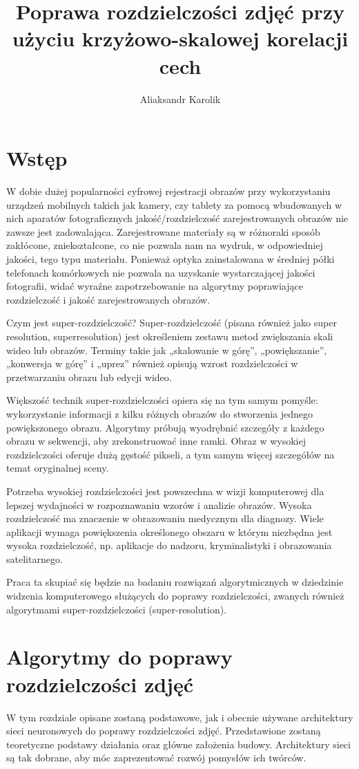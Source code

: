 \documentclass[a4paper,12pt,twoside,openany]{report}
\title{Poprawa rozdzielczości zdjęć przy użyciu krzyżowo-skalowej korelacji cech}
\author{Aliaksandr Karolik}
\begin{document}
\maketitle

\chapter{Wstęp}
	W dobie dużej popularności cyfrowej rejestracji obrazów przy wykorzystaniu urządzeń mobilnych takich jak kamery, czy tablety za pomocą wbudowanych w  nich aparatów fotograficznych jakość/rozdzielczość zarejestrowanych obrazów nie zawsze jest zadowalająca. Zarejestrowane materiały są w różnoraki sposób zakłócone, zniekształcone, co nie pozwala nam na wydruk, w odpowiedniej jakości, tego typu materiału. Ponieważ optyka zainstalowana w średniej półki telefonach komórkowych nie pozwala na uzyskanie wystarczającej jakości fotografii, widać wyraźne zapotrzebowanie na algorytmy poprawiające rozdzielczość i jakość zarejestrowanych obrazów.
	
	Czym jest super-rozdzielczość? Super-rozdzielczość (pisana również jako super resolution, superresolution) jest określeniem zestawu metod zwiększania skali wideo lub obrazów. Terminy takie jak „skalowanie w górę”, „powiększanie”, „konwersja w górę” i „uprez” również opisują wzrost rozdzielczości w przetwarzaniu obrazu lub edycji wideo. 
	
	Większość technik super-rozdzielczości opiera się na tym samym pomyśle: wykorzystanie informacji z kilku różnych obrazów do stworzenia jednego powiększonego obrazu. Algorytmy próbują wyodrębnić szczegóły z każdego obrazu w sekwencji, aby zrekonstruować inne ramki. Obraz w wysokiej rozdzielczości oferuje dużą gęstość pikseli, a tym samym więcej szczegółów na temat oryginalnej sceny.

	Potrzeba wysokiej rozdzielczości jest powszechna w wizji komputerowej dla lepszej wydajności w rozpoznawaniu wzorów i analizie obrazów. Wysoka rozdzielczość ma znaczenie w obrazowaniu medycznym dla diagnozy. Wiele aplikacji wymaga powiększenia określonego obszaru w którym niezbędna jest wysoka rozdzielczość, np. aplikacje do nadzoru, kryminalistyki i obrazowania satelitarnego.

	Praca ta skupiać się będzie na badaniu rozwiązań algorytmicznych w dziedzinie widzenia komputerowego służących do poprawy rozdzielczości, zwanych również algorytmami super-rozdzielczości (super-resolution). 


\chapter{Algorytmy do poprawy rozdzielczości zdjęć}
W tym rozdziale opisane zostaną podstawowe, jak i obecnie używane architektury sieci neuronowych  do poprawy rozdzielczości zdjęć. Przedstawione zostaną teoretyczne podstawy działania oraz główne założenia budowy. Architektury sieci są tak dobrane, aby móc zaprezentować rozwój pomysłów ich twórców.
\end{document}

